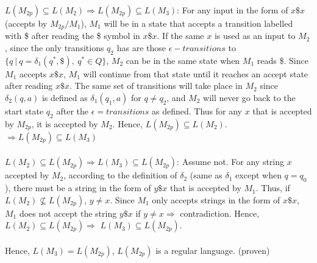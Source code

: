 \documentclass[12pt]{article}
\theoremstyle{definition}
\numberwithin{equation}{section}
\begin{document}
$L(M_{2p}) \subseteq L(M_2) \Rightarrow L(M_{2p}) \subseteq L(M_3)$: For any input in the form of $x\$x$ (accepts by $M_{2p}/M_1$),  $M_1$ will be in a state that accepts a transition labelled with \$ after reading the \$ symbol in $x\$x$. If the same $x$ is used as an input to $M_2$, since the only transitions $q_2$ has are those $\epsilon-transitions$ to $\{q\ |\ q = \delta_1(q^*, \$),\ q^* \in Q\}$, $M_2$ can be in the same state when $M_1$ reads \$. Since $M_1$ accepts $x\$x$, $M_1$ will continue from that state until it reaches an accept state after reading $x\$x$. The same set of transitions will take place in $M_2$ since $\delta_2(q, a)$ is defined as $\delta_1(q_1, a)$ for $q \neq q_2$, and $M_2$ will never go back to the start state $q_2$ after the $\epsilon=transitions$ as defined. Thus for any $x$ that is accepted by $M_{2p}$, it is accepted by $M_2$. Hence, $L(M_{2p}) \subseteq L(M_2)$. $\Rightarrow  L(M_{2p}) \subseteq L(M_3)$ \\~\\

$L(M_2)\subseteq L(M_{2p}) \Rightarrow L(M_3)\subseteq L(M_{2p})$: Assume not. For any string $x$ accepted by $M_2$, according to the definition of $\delta_2$ (same as $\delta_1$ except when $q = q_0$), there must be a string in the form of $y\$x$ that is accepted by $M_1$. Thus, if $L(M_2)\nsubseteq L(M_{2p})$, $y \neq x$. Since $M_1$ only accepts strings in the form of $x\$x$, $M_1$ does not accept the string $y\$x$ if $y \neq x \Rightarrow$ contradiction. Hence, $L(M_2)\subseteq L(M_{2p}) \Rightarrow$ $L(M_3)\subseteq L(M_{2p})$. \\~\\

Hence, $L(M_3)= L(M_{2p})$, $L(M_{2p})$ is a regular language. (proven)
\end{document}
